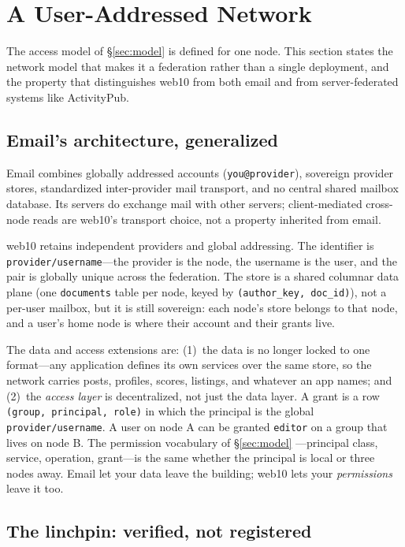 \documentclass[sigconf, nonacm]{acmart}
\begin{document}
\section{A User-Addressed Network}
\label{sec:network}

The access model of \S\ref{sec:model} is defined for one node. This section
states the network model that makes it a federation rather than a single
deployment, and the property that distinguishes web10 from both email and from
server-federated systems like ActivityPub.

\subsection{Email's architecture, generalized}

Email combines globally addressed accounts (\texttt{you@provider}), sovereign
provider stores, standardized inter-provider mail transport, and no central
shared mailbox database. Its servers do exchange mail with other servers;
client-mediated cross-node reads are web10's transport choice, not a property
inherited from email.

web10 retains independent providers and global addressing. The identifier is
\texttt{provider/username}---the provider is the node, the username is the
user, and the pair is globally unique across the federation. The store is a
shared columnar data plane (one \texttt{documents} table per node, keyed by
\texttt{(author\_key, doc\_id)}), not a per-user mailbox, but it is still
sovereign: each node's store belongs to that node, and a user's home node is
where their account and their grants live.

The data and access extensions are: (1)~the data is no longer locked to one format---any
application defines its own services over the same store, so the network
carries posts, profiles, scores, listings, and whatever an app names; and
(2)~the \emph{access layer} is decentralized, not just the data layer. A grant
is a row \texttt{(group, principal, role)} in which the principal is the global
\texttt{provider/username}. A user on node A can be granted \texttt{editor} on
a group that lives on node B. The permission vocabulary of \S\ref{sec:model}
---principal class, service, operation, grant---is the same whether the
principal is local or three nodes away. Email let your data leave the building;
web10 lets your \emph{permissions} leave it too.

\subsection{The linchpin: verified, not registered}
\end{document}
